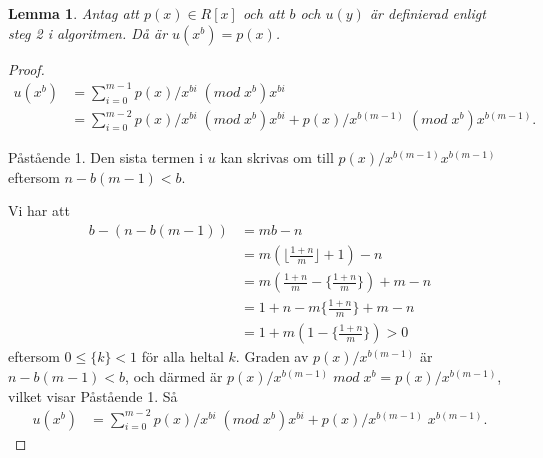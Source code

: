 \documentclass[a4paper]{article}
\newtheorem{lemma}[theorem]{Lemma}
\begin{document}
\begin{lemma}
 Antag att $p(x) \in R[x]$ och att $b$ och $u(y)$ är definierad enligt steg 2 i algoritmen. Då är $u(x^b)=p(x)$.
\end{lemma}
\begin{proof}


\begin{align*}
u(x^b) &= \sum_{i = 0}^{m-1} p(x)/x^{bi} \; (mod \; x^b) x^{bi} \\
&= \sum_{i = 0}^{m-2} p(x)/x^{bi} \; (mod \; x^b) x^{bi} + p(x)/x^{b(m-1)} \; (mod \; x^b) x^{b(m-1)}.
\end{align*}

Påstående 1. Den sista termen i $u$ kan skrivas om till $p(x)/x^{b(m-1)} x^{b(m-1)}$ eftersom $n - b(m-1) < b$.

Vi har att
\begin{align*}
 b - (n - b(m-1)) &= m b - n \\
&= m (\lfloor \frac{1 + n}{m}\rfloor + 1) - n \\
&= m( \frac{1 + n}{m} -\{ \frac{1 + n}{m}\} ) + m - n \\
&= 1 + n - m \{ \frac{1 + n}{m}\} + m - n \\
&= 1 + m(1 - \{ \frac{1 + n}{m}\}) > 0
\end{align*}
eftersom $0 \leq \{ k \} < 1$ för alla heltal $k$. Graden av $p(x)/x^{b(m-1)}$ är $n - b(m-1) < b$,
och därmed är $p(x)/x^{b(m-1)} \; mod \; x^b = p(x)/x^{b(m-1)}$, vilket visar Påstående 1. Så
\begin{align*}
u(x^b) &= \sum_{i = 0}^{m-2} p(x)/x^{bi} \; (mod \; x^b) x^{bi} + p(x)/x^{b(m-1)} \; x^{b(m-1)}.
\end{align*}
\end{proof}



\nocite{*}

\appendix
\end{document}
